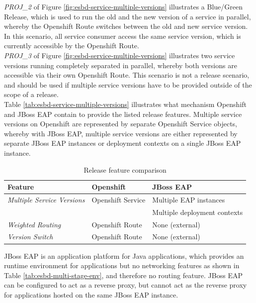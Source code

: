 \emph{PROJ\_2} of Figure \vref{fig:esbd-service-multiple-versions} illustrates a Blue/Green Release, which is used to run the old and the new version of a service in parallel, whereby the Openshift Route switches between the old and new service version. In this scenario, all service consumer access the same service version, which is currently accessible by the Openshift Route. \\

\emph{PROJ\_3} of Figure \vref{fig:esbd-service-multiple-versions} illustrates two service versions running completely separated in parallel, whereby both versions are accessible via their own Openshift Route. This scenario is not a release scenario, and should be used if multiple service versions have to be provided outside of the scope of a release. \\

Table \vref{tab:esbd-service-multiple-versions} illustrates what mechanism Openshift and JBoss EAP contain to provide the listed release features. Multiple service versions on Openshift are represented by separate Openshift Service objects, whereby with JBoss EAP, multiple service versions are either represented by separate JBoss EAP instances or deployment contexts on a single JBoss EAP instance.

{\renewcommand{\arraystretch}{1.2}%
	\begin{table}[h]
		\begin{tabularx}{\textwidth}{ X|X|X }	
			\textbf{Feature}                  & \textbf{Openshift}      & \textbf{JBoss EAP} \\  \hline
			\textit{Multiple Service Versions}& Openshift Service       & Multiple EAP instances \\
																	   && Multiple deployment contexts \\ \hline
			\textit{Weighted Routing}         & Openshift Route         & None (external) \\  \hline
			\textit{Version Switch}           & Openshift Route         & None (external) \\  \hline
		\end{tabularx}
		\caption{Release feature comparison}
		\label{tab:esbd-service-multiple-versions}
\end{table}}

JBoss EAP is an application platform for Java applications, which provides an runtime environment for applications but no networking features as shown in Table \vref{tab:esbd-multi-stage-env}, and therefore no routing feature. JBoss EAP can be configured to act as a reverse proxy, but cannot act as the reverse proxy for applications hosted on the same JBoss EAP instance. \\

